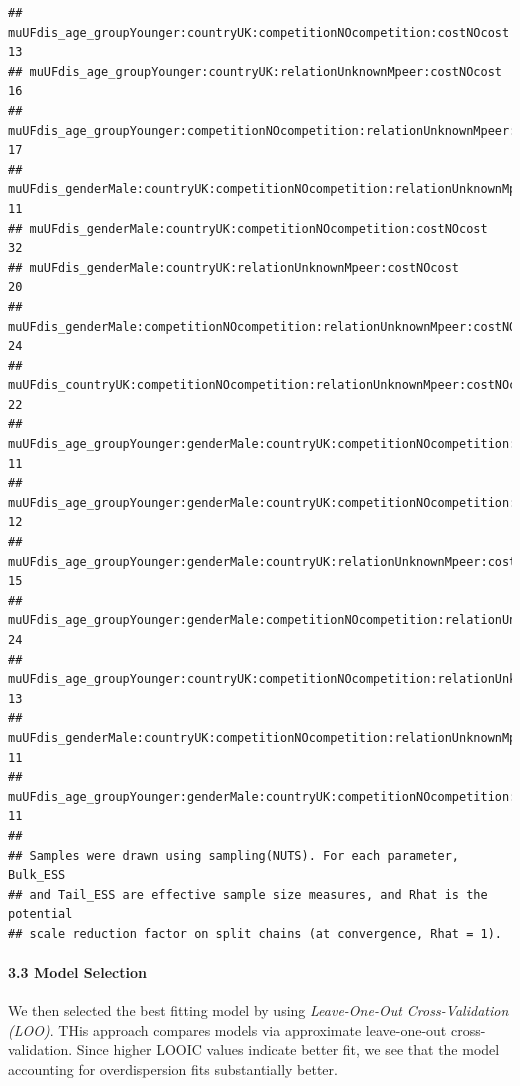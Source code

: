 \documentclass[
]{article}
\begin{document}
\begin{verbatim}
## muUFdis_age_groupYounger:countryUK:competitionNOcompetition:costNOcost                                       13
## muUFdis_age_groupYounger:countryUK:relationUnknownMpeer:costNOcost                                           16
## muUFdis_age_groupYounger:competitionNOcompetition:relationUnknownMpeer:costNOcost                            17
## muUFdis_genderMale:countryUK:competitionNOcompetition:relationUnknownMpeer                                   11
## muUFdis_genderMale:countryUK:competitionNOcompetition:costNOcost                                             32
## muUFdis_genderMale:countryUK:relationUnknownMpeer:costNOcost                                                 20
## muUFdis_genderMale:competitionNOcompetition:relationUnknownMpeer:costNOcost                                  24
## muUFdis_countryUK:competitionNOcompetition:relationUnknownMpeer:costNOcost                                   22
## muUFdis_age_groupYounger:genderMale:countryUK:competitionNOcompetition:relationUnknownMpeer                  11
## muUFdis_age_groupYounger:genderMale:countryUK:competitionNOcompetition:costNOcost                            12
## muUFdis_age_groupYounger:genderMale:countryUK:relationUnknownMpeer:costNOcost                                15
## muUFdis_age_groupYounger:genderMale:competitionNOcompetition:relationUnknownMpeer:costNOcost                 24
## muUFdis_age_groupYounger:countryUK:competitionNOcompetition:relationUnknownMpeer:costNOcost                  13
## muUFdis_genderMale:countryUK:competitionNOcompetition:relationUnknownMpeer:costNOcost                        11
## muUFdis_age_groupYounger:genderMale:countryUK:competitionNOcompetition:relationUnknownMpeer:costNOcost       11
## 
## Samples were drawn using sampling(NUTS). For each parameter, Bulk_ESS
## and Tail_ESS are effective sample size measures, and Rhat is the potential
## scale reduction factor on split chains (at convergence, Rhat = 1).
\end{verbatim}

\hypertarget{model-selection}{%
\paragraph{3.3 Model Selection}\label{model-selection}}

We then selected the best fitting model by using \emph{Leave-One-Out
Cross-Validation (LOO)}. THis approach compares models via approximate
leave-one-out cross-validation. Since higher LOOIC values indicate
better fit, we see that the model accounting for overdispersion fits
substantially better.
\end{document}
